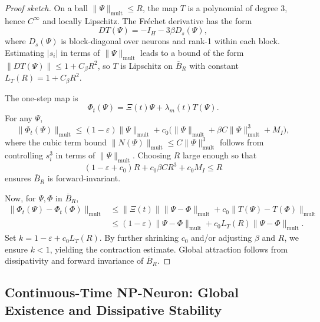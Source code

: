 \documentclass[11pt]{article}
\begin{document}
\begin{proof}[Proof sketch]
On a ball \(\|\Psi\|_{\mathrm{mult}}\le R\), the map \(T\) is a polynomial of degree 3, hence \(C^\infty\) and locally Lipschitz.
The Fréchet derivative has the form
\[
DT(\Psi) = -I_H - 3\beta D_s(\Psi),
\]
where \(D_s(\Psi)\) is block-diagonal over neurons and rank-1 within each block.
Estimating \(|s_i|\) in terms of \(\|\Psi\|_{\mathrm{mult}}\) leads to a bound of the form
\(\|DT(\Psi)\|\le 1 + C_\beta R^2\), so \(T\) is Lipschitz on \(\overline{B}_R\) with constant
\(L_T(R) = 1 + C_\beta R^2\).

The one-step map is
\[
\Phi_t(\Psi) = \Xi(t)\Psi + \lambda_m(t)T(\Psi).
\]
For any \(\Psi\),
\[
\|\Phi_t(\Psi)\|_{\mathrm{mult}}
\le (1-\varepsilon)\|\Psi\|_{\mathrm{mult}} + c_0\bigl(\|\Psi\|_{\mathrm{mult}} + \beta C \|\Psi\|_{\mathrm{mult}}^3 + M_I\bigr),
\]
where the cubic term bound \(\|N(\Psi)\|_{\mathrm{mult}}\le C\|\Psi\|_{\mathrm{mult}}^3\) follows from controlling \(s_i^3\) in terms of \(\|\Psi\|_{\mathrm{mult}}\).
Choosing \(R\) large enough so that
\[
(1-\varepsilon + c_0)R + c_0\beta C R^3 + c_0 M_I \le R
\]
ensures \(\overline{B}_R\) is forward-invariant.

Now, for \(\Psi,\Phi\) in \(\overline{B}_R\),
\[
\begin{aligned}
\|\Phi_t(\Psi) - \Phi_t(\Phi)\|_{\mathrm{mult}}
&\le \|\Xi(t)\|\|\Psi-\Phi\|_{\mathrm{mult}}
+ c_0 \|T(\Psi) - T(\Phi)\|_{\mathrm{mult}} \\
&\le (1-\varepsilon)\|\Psi-\Phi\|_{\mathrm{mult}}
+ c_0 L_T(R)\|\Psi-\Phi\|_{\mathrm{mult}}.
\end{aligned}
\]
Set \(k = 1-\varepsilon + c_0 L_T(R)\).
By further shrinking \(c_0\) and/or adjusting \(\beta\) and \(R\), we ensure \(k < 1\), yielding the contraction estimate.
Global attraction follows from dissipativity and forward invariance of \(\overline{B}_R\).
\end{proof}

\subsection{Continuous-Time NP-Neuron: Global Existence and Dissipative Stability}
\end{document}
